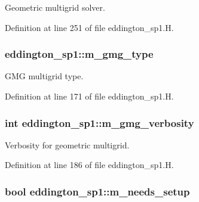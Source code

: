 Geometric multigrid solver. 



Definition at line 251 of file eddington\+\_\+sp1.\+H.

\subsubsection[{\texorpdfstring{m\+\_\+gmg\+\_\+type}{m_gmg_type}}]{ eddington\+\_\+sp1\+::m\+\_\+gmg\+\_\+type\hspace{0.3cm}{\ttfamily [protected]}}\hypertarget{classeddington__sp1_ac1c0be0f42857fe5a515a28f337f5b2f}{}\label{classeddington__sp1_ac1c0be0f42857fe5a515a28f337f5b2f}


G\+MG multigrid type. 



Definition at line 171 of file eddington\+\_\+sp1.\+H.

\subsubsection[{\texorpdfstring{m\+\_\+gmg\+\_\+verbosity}{m_gmg_verbosity}}]{\setlength{\rightskip}{0pt plus 5cm}int eddington\+\_\+sp1\+::m\+\_\+gmg\+\_\+verbosity\hspace{0.3cm}{\ttfamily [protected]}}\hypertarget{classeddington__sp1_a63f5d931c8bc9b7dd0f5d3430b70f261}{}\label{classeddington__sp1_a63f5d931c8bc9b7dd0f5d3430b70f261}


Verbosity for geometric multigrid. 



Definition at line 186 of file eddington\+\_\+sp1.\+H.

\subsubsection[{\texorpdfstring{m\+\_\+needs\+\_\+setup}{m_needs_setup}}]{\setlength{\rightskip}{0pt plus 5cm}bool eddington\+\_\+sp1\+::m\+\_\+needs\+\_\+setup\hspace{0.3cm}{\ttfamily [protected]}}\hypertarget{classeddington__sp1_a854d16ba64e762d17a0b6bd93ae5966f}{}\label{classeddington__sp1_a854d16ba64e762d17a0b6bd93ae5966f}


